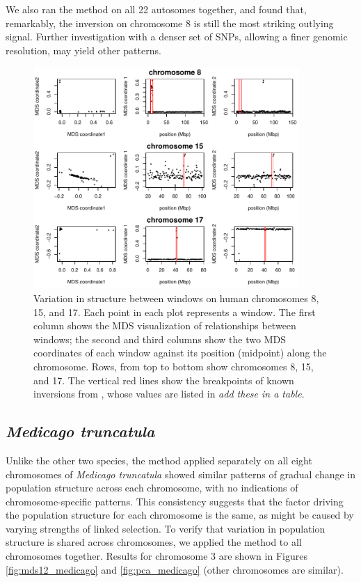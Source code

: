 \documentclass[11pt, oneside]{article}   	%
\newcommand{\plr}[1]{{\em \color{blue} #1}}
\begin{document}
We also ran the method on all 22 autosomes together, 
and found that, remarkably, 
the inversion on chromosome 8 is still the most striking outlying signal.
Further investigation with a denser set of SNPs,
allowing a finer genomic resolution,
may yield other patterns.

\begin{figure}
    \begin{center}
       \includegraphics[width=0.9\textwidth]{Fig4_POPRES_Together_MDS_plot_chr8_15_17}
    \end{center}
    \caption{
         Variation in structure between windows on human chromosomes 8, 15, and 17. 
         Each point in each plot represents a window.
         The first column shows the MDS visualization of relationships between windows;
         the second and third columns show the two MDS coordinates of each window against its position (midpoint) along the chromosome. 
         Rows, from top to bottom show chromosomes 8, 15, and 17. 
         The vertical red lines show the breakpoints of known inversions from \citep{antonacci2009characterization},
         whose values are listed in \plr{add these in a table}.
        \label{fig:mds_human}
    }
\end{figure}


\subsection{\textit{Medicago truncatula}}

Unlike the other two species,
the method applied separately on all eight chromosomes of \textit{Medicago truncatula} 
showed similar patterns of gradual change in population structure across each chromosome,
with no indications of chromosome-specific patterns.
This consistency suggests that the factor driving the population structure for each chromosome is the same,
as might be caused by varying strengths of linked selection.
To verify that variation in population structure is shared across chromosomes,
we applied the method to all chromosomes together.
Results for chromosome 3 are shown in Figures \ref{fig:mds12_medicago} and \ref{fig:pca_medicago}
(other chromosomes are similar).
\end{document}
